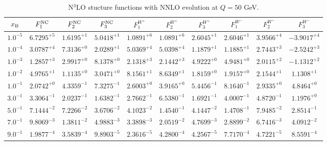 \begin{table}[h]
\begin{adjustbox}{width=\textwidth}
\begin{tabular}{|c||c|c|c|c|c|c|c|c|c|}
\hline
$x_{\rm B}$ & $F_1^{\rm NC}$ & $F_2^{\rm NC}$ & $F_3^{\rm NC}$ & $F_1^{W^+}$ & $F_2^{W^+}$ & $F_3^{W^+}$ & $F_1^{W^-}$ & $F_2^{W^-}$ & $F_3^{W^-}$ \\
\hline
$ 1.0^{-5}$ & $ 6.7295^{+5}$ & $ 1.6195^{+1}$ & $ 5.0418^{+1}$ & $ 1.0891^{+6}$ & $ 1.0891^{+6}$ & $ 2.6045^{+1}$ & $ 2.6046^{+1}$ & $ 3.9566^{+4}$ & $-3.9017^{+4}$ \\
$ 1.0^{-4}$ & $ 3.0787^{+4}$ & $ 7.3136^{+0}$ & $ 2.0289^{+1}$ & $ 5.0369^{+4}$ & $ 5.0398^{+4}$ & $ 1.1879^{+1}$ & $ 1.1885^{+1}$ & $ 2.7443^{+3}$ & $-2.5242^{+3}$ \\
$ 1.0^{-3}$ & $ 1.2857^{+3}$ & $ 2.9917^{+0}$ & $ 8.1378^{+0}$ & $ 2.1318^{+3}$ & $ 2.1442^{+3}$ & $ 4.9222^{+0}$ & $ 4.9481^{+0}$ & $ 2.0115^{+2}$ & $-1.1312^{+2}$ \\
$ 1.0^{-2}$ & $ 4.9765^{+1}$ & $ 1.1135^{+0}$ & $ 3.0471^{+0}$ & $ 8.1561^{+1}$ & $ 8.6349^{+1}$ & $ 1.8159^{+0}$ & $ 1.9157^{+0}$ & $ 2.1544^{+1}$ & $ 1.1308^{+1}$ \\
$ 1.0^{-1}$ & $ 2.0742^{+0}$ & $ 4.3359^{-1}$ & $ 7.3275^{-1}$ & $ 2.6003^{+0}$ & $ 3.9165^{+0}$ & $ 5.4456^{-1}$ & $ 8.1640^{-1}$ & $ 2.9335^{+0}$ & $ 4.8464^{+0}$ \\
$ 3.0^{-1}$ & $ 3.3064^{-1}$ & $ 2.0237^{-1}$ & $ 1.6382^{-1}$ & $ 2.7662^{-1}$ & $ 6.5380^{-1}$ & $ 1.6921^{-1}$ & $ 4.0007^{-1}$ & $ 4.8720^{-1}$ & $ 1.1976^{+0}$ \\
$ 5.0^{-1}$ & $ 7.1444^{-2}$ & $ 7.2266^{-2}$ & $ 3.6706^{-2}$ & $ 4.1023^{-2}$ & $ 1.4540^{-1}$ & $ 4.1447^{-2}$ & $ 1.4708^{-1}$ & $ 7.9485^{-2}$ & $ 2.8514^{-1}$ \\
$ 7.0^{-1}$ & $ 9.8069^{-3}$ & $ 1.3811^{-2}$ & $ 4.9883^{-3}$ & $ 3.3898^{-3}$ & $ 2.0519^{-2}$ & $ 4.7699^{-3}$ & $ 2.8899^{-2}$ & $ 6.7416^{-3}$ & $ 4.0912^{-2}$ \\
$ 9.0^{-1}$ & $ 1.9877^{-4}$ & $ 3.5839^{-4}$ & $ 9.8903^{-5}$ & $ 2.3616^{-5}$ & $ 4.2800^{-4}$ & $ 4.2567^{-5}$ & $ 7.7170^{-4}$ & $ 4.7221^{-5}$ & $ 8.5591^{-4}$ \\
\hline
\end{tabular}
\end{adjustbox}\caption{N$^{3}$LO stucture functions with NNLO evolution at $Q = 50$ GeV.}
\label{tab:N3LO-Q50}
\end{table}


